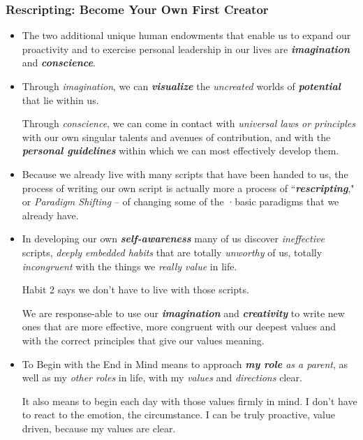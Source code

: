 \documentclass[11pt]{article}
\begin{document}
\subsubsection{Rescripting: Become Your Own First Creator}
\begin{itemize}
\item The two additional unique human endowments that enable us to expand our proactivity and to exercise personal leadership in our lives are \emph{\textbf{imagination}} and \emph{\textbf{conscience}}.

\item Through \emph{imagination}, we can \emph{\textbf{visualize}} the \emph{uncreated} worlds of \emph{\textbf{potential}} that lie within us.

Through \emph{conscience}, we can come in contact with \emph{universal laws or principles} with our own singular talents and avenues of contribution, and with the \emph{\textbf{personal guidelines}} within which we can most effectively develop them. 

\item Because we already live with many scripts that have been handed to us, the process of writing our own script is actually more a process of ``\emph{\textbf{rescripting}}," or \emph{Paradigm Shifting} -- of changing some of the ·basic paradigms that we already have. 

\item In developing our own \emph{\textbf{self-awareness}} many of us discover \emph{ineffective} scripts, \emph{deeply embedded habits} that are totally \emph{unworthy} of us, totally \emph{incongruent} with the things we \emph{really value} in life. 

Habit 2 says we don't have to live with those scripts. 

We are response-able to use our \emph{\textbf{imagination}} and \emph{\textbf{creativity}} to write new ones that are more effective, more congruent with our deepest values and with
the correct principles that give our values meaning.

\item To Begin with the End in Mind means to approach \emph{\textbf{my role} as a parent}, as well as my \emph{other roles} in life, with my \emph{values} and \emph{directions} clear.

It also means to begin each day with those values firmly in mind. I don't have to react to the emotion, the circumstance. I can be truly proactive, value driven, because my values are clear.
\end{itemize}
\end{document}
